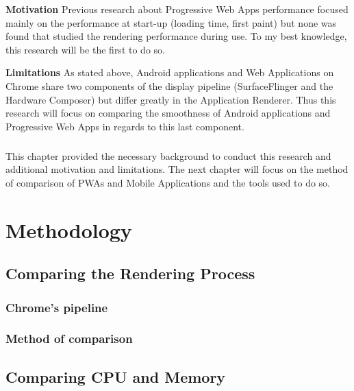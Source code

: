 \documentclass{kththesis}
\begin{document}
\textbf{Motivation} \newline
Previous research about Progressive Web Apps performance focused mainly on the performance at start-up (loading time, first paint) but none was found that studied the rendering performance during use. To my best knowledge, this research will be the first to do so.

\medskip
\textbf{Limitations} \newline
As stated above, Android applications and Web Applications on Chrome share two components of the display pipeline (SurfaceFlinger and the Hardware Composer) but differ greatly in the Application Renderer. Thus this research will focus on comparing the smoothness of Android applications and Progressive Web Apps in regards to this last component. 


\paragraph{}
This chapter provided the necessary background to conduct this research and additional motivation and limitations. The next chapter will focus on the method of comparison of PWAs and Mobile Applications and the tools used to do so.

    

\chapter{Methodology}
\section{Comparing the Rendering Process}
   

    \subsection{Chrome's pipeline}
    \subsection{Method of comparison}
\section{Comparing CPU and Memory}
\end{document}
